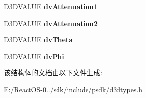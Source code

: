 \begin{DoxyCompactItemize}
\item 
\mbox{\label{struct___d3_d_l_i_g_h_t_ab7136816605ce2e487dd5313d6f849e8}} 
D3\+D\+V\+A\+L\+UE {\bfseries dv\+Attenuation1}
\item 
\mbox{\label{struct___d3_d_l_i_g_h_t_a36e12eedf4ae98ca6999c4196a4d5cb6}} 
D3\+D\+V\+A\+L\+UE {\bfseries dv\+Attenuation2}
\item 
\mbox{\label{struct___d3_d_l_i_g_h_t_aed1aa4db77d67368f08a70c2f65cae9d}} 
D3\+D\+V\+A\+L\+UE {\bfseries dv\+Theta}
\item 
\mbox{\label{struct___d3_d_l_i_g_h_t_ac6d1ae82fa1d96f88ad76adc8eef7a5e}} 
D3\+D\+V\+A\+L\+UE {\bfseries dv\+Phi}
\end{DoxyCompactItemize}


该结构体的文档由以下文件生成\+:\begin{DoxyCompactItemize}
\item 
E\+:/\+React\+O\+S-\/0../sdk/include/psdk/d3dtypes.\+h\end{DoxyCompactItemize}
